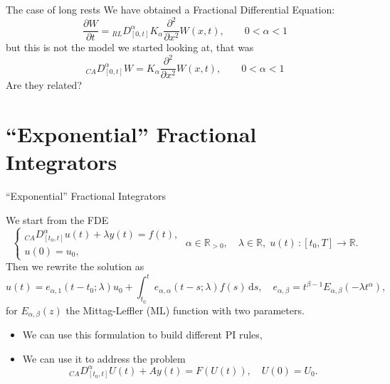 \documentclass[aspectratio=169,xcolor=dvipsnames]{beamer}
\begin{document}
\begin{frame}{The case of long rests}
We have obtained a Fractional Differential Equation:
\[
\frac{\partial W}{\partial t} = {}_{RL}D_{[0,t]}^\alpha K_\alpha \frac{\partial^2}{\partial x^2} W(x,t), \qquad 0 < \alpha < 1
\]
but this is not the model we started looking at, that was
\[
{}_{CA}D_{[0,t]}^\alpha W = K_\alpha \frac{\partial^2}{\partial x^2} W(x,t), \qquad 0 < \alpha < 1
\]
\faQuestionCircle\;\alert{Are they related?} \vfill


\end{frame}

\section{``Exponential'' Fractional Integrators}

\begin{frame}{``Exponential'' Fractional Integrators}

We start from the FDE
\[
\begin{cases}
{}_{CA}D^\alpha_{[t_0,t]} u(t) + \lambda y(t) = f(t), \\
u(0) = u_0,
\end{cases} \; \alpha \in \mathbb{R}_{> 0}, \quad \lambda \in \mathbb{R}, \; u(t)\,:[t_0,T] \rightarrow \mathbb{R}.
\]
Then we rewrite the solution as
\[
u(t) = e_{\alpha,1}(t-t_0;\lambda) u_0 + \int_{t_0}^{t} e_{\alpha,\alpha}(t-s;\lambda) f(s)\,\textrm{d}s, \quad e_{\alpha,\beta} = t^{\beta - 1} E_{\alpha,\beta}(-\lambda t^\alpha),
\]
for $E_{\alpha,\beta}(z)$ the Mittag-Leffler (ML) function with two parameters.

\begin{itemize}
	\item[\faLightbulb]<2-> We can use this formulation to build different PI rules,
	\item[\faLightbulb]<3-> We can use it to address the problem
	\[
	{}_{CA}D^\alpha_{[t_0,t]} U(t) + A y(t) = F(U(t)), \quad U(0) = U_0.
	\]
\end{itemize}

\end{frame}
\end{document}
